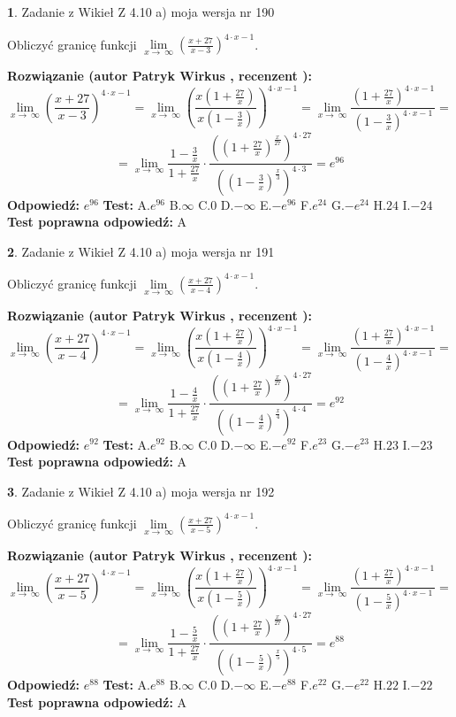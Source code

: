 \documentclass[12pt, a4paper]{article}
\theoremstyle{definition} %
\newtheorem{zad}{}
\newcommand{\zadStart}[1]{\begin{zad}#1\newline}
\newcommand{\zadStop}{\end{zad}}
\newcommand{\rozwStart}[2]{\noindent \textbf{Rozwiązanie (autor #1 , recenzent #2): }\newline}
\newcommand{\rozwStop}{\newline}
\newcommand{\odpStart}{\noindent \textbf{Odpowiedź:}\newline}
\newcommand{\odpStop}{\newline}
\newcommand{\testStart}{\noindent \textbf{Test:}\newline}
\newcommand{\testStop}{\newline}
\newcommand{\kluczStart}{\noindent \textbf{Test poprawna odpowiedź:}\newline}
\newcommand{\kluczStop}{\newline}
\begin{document}
\zadStart{Zadanie z Wikieł Z 4.10 a) moja wersja nr 190}

Obliczyć granicę funkcji  $\lim\limits_{x\to\ \infty}(\frac{x+27}{x-3})^{4\cdot x-1}$.
\zadStop
\rozwStart{Patryk Wirkus}{}
$$\lim\limits_{x\to\ \infty}(\frac{x+27}{x-3})^{4\cdot x-1} = \lim\limits_{x\to\ \infty}(\frac{x(1+\frac{27}{x})}{x(1-\frac{3}{x})})^{4\cdot x-1}=\lim\limits_{x\to\ \infty}\frac{(1+\frac{27}{x})^{4\cdot x-1}}{(1-\frac{3}{x})^{4\cdot x-1}}=$$
$$=\lim\limits_{x\to\ \infty}\frac{1-\frac{3}{x}}{1+\frac{27}{x}}\cdot\frac{((1+\frac{27}{x})^{\frac{x}{27}})^{4\cdot27}}{((1-\frac{3}{x})^{\frac{x}{3}})^{4\cdot3}}=e^{96}$$
\rozwStop
\odpStart
$e^{96}$
\odpStop
\testStart
A.$e^{96}$ B.$\infty$ C.$0$ D.$-\infty$ E.$-e^{96}$
F.$e^{24}$ G.$-e^{24}$
H.$24$
I.$-24$
\testStop
\kluczStart
A
\kluczStop



\zadStart{Zadanie z Wikieł Z 4.10 a) moja wersja nr 191}

Obliczyć granicę funkcji  $\lim\limits_{x\to\ \infty}(\frac{x+27}{x-4})^{4\cdot x-1}$.
\zadStop
\rozwStart{Patryk Wirkus}{}
$$\lim\limits_{x\to\ \infty}(\frac{x+27}{x-4})^{4\cdot x-1} = \lim\limits_{x\to\ \infty}(\frac{x(1+\frac{27}{x})}{x(1-\frac{4}{x})})^{4\cdot x-1}=\lim\limits_{x\to\ \infty}\frac{(1+\frac{27}{x})^{4\cdot x-1}}{(1-\frac{4}{x})^{4\cdot x-1}}=$$
$$=\lim\limits_{x\to\ \infty}\frac{1-\frac{4}{x}}{1+\frac{27}{x}}\cdot\frac{((1+\frac{27}{x})^{\frac{x}{27}})^{4\cdot27}}{((1-\frac{4}{x})^{\frac{x}{4}})^{4\cdot4}}=e^{92}$$
\rozwStop
\odpStart
$e^{92}$
\odpStop
\testStart
A.$e^{92}$ B.$\infty$ C.$0$ D.$-\infty$ E.$-e^{92}$
F.$e^{23}$ G.$-e^{23}$
H.$23$
I.$-23$
\testStop
\kluczStart
A
\kluczStop



\zadStart{Zadanie z Wikieł Z 4.10 a) moja wersja nr 192}

Obliczyć granicę funkcji  $\lim\limits_{x\to\ \infty}(\frac{x+27}{x-5})^{4\cdot x-1}$.
\zadStop
\rozwStart{Patryk Wirkus}{}
$$\lim\limits_{x\to\ \infty}(\frac{x+27}{x-5})^{4\cdot x-1} = \lim\limits_{x\to\ \infty}(\frac{x(1+\frac{27}{x})}{x(1-\frac{5}{x})})^{4\cdot x-1}=\lim\limits_{x\to\ \infty}\frac{(1+\frac{27}{x})^{4\cdot x-1}}{(1-\frac{5}{x})^{4\cdot x-1}}=$$
$$=\lim\limits_{x\to\ \infty}\frac{1-\frac{5}{x}}{1+\frac{27}{x}}\cdot\frac{((1+\frac{27}{x})^{\frac{x}{27}})^{4\cdot27}}{((1-\frac{5}{x})^{\frac{x}{5}})^{4\cdot5}}=e^{88}$$
\rozwStop
\odpStart
$e^{88}$
\odpStop
\testStart
A.$e^{88}$ B.$\infty$ C.$0$ D.$-\infty$ E.$-e^{88}$
F.$e^{22}$ G.$-e^{22}$
H.$22$
I.$-22$
\testStop
\kluczStart
A
\kluczStop
\end{document}
